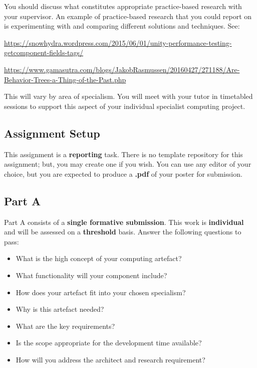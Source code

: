 \documentclass{../../fal_assignment}
\begin{document}
You should discuss what constitutes appropriate practice-based research with your supervisor. An example of practice-based research that you could report on is experimenting with and comparing different solutions and techniques. See:

\begin{sloppypar}
\url{https://snowhydra.wordpress.com/2015/06/01/unity-performance-testing-getcomponent-fields-tags/} 

\href{https://www.gamasutra.com/blogs/JakobRasmussen/20160427/271188/Are_Behavior_Trees_a_Thing_of_the_Past.php}{https://www.gamasutra.com/blogs/JakobRasmussen/20160427/271188/Are-Behavior-Trees-a-Thing-of-the-Past.php}
\end{sloppypar}

This will vary by area of specialism. You will meet with your tutor in timetabled sessions to support this aspect of your individual specialist computing project.

\subsection*{Assignment Setup}

This assignment is a \textbf{reporting} task. There is no template repository for this assignment; but, you may create one if you wish. You can use any editor of your choice, but you are expected to produce a \textbf{.pdf} of your poster for submission.

\subsection*{Part A}

Part A consists of a \textbf{single formative submission}. This work is \textbf{individual} and will be assessed on a \textbf{threshold} basis. Answer the following questions to pass:

\begin{itemize}
	\item What is the high concept of your computing artefact?
	\item What functionality will your component include?
	\item How does your artefact fit into your chosen specialism?
	\item Why is this artefact needed?
	\item What are the key requirements?
	\item Is the scope appropriate for the development time available?
	\item How will you address the architect and research requirement?
\end{itemize}
\end{document}
